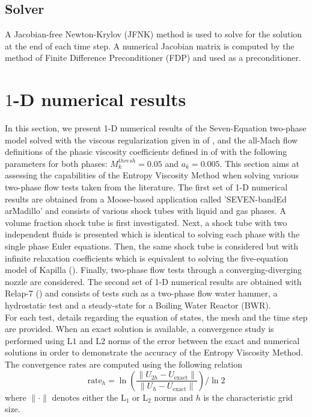 \documentclass[preprint,10pt]{elsarticle}
\begin{document}
\subsection{Solver} \label{sec:solver}
%
A Jacobian-free Newton-Krylov (JFNK) method is used to solve for the solution at the end of each time step. A numerical Jacobian matrix is computed by the 
method of Finite Difference Preconditioner (FDP) and used as a preconditioner.
%
\section{$1$-D numerical results}\label{sec:results}
%
In this section, we present 1-D numerical results of the Seven-Equation two-phase model solved with the viscous regularization given in  of , 
and the all-Mach flow definitions of the phasic viscosity coefficients defined in  of  with the following parameters for both phases: $M_k^{thresh}=0.05$ and $a_k=0.005$. This section aims at assessing the capabilities of the Entropy 
Viscosity Method when solving various two-phase flow tests taken from the literature. The first set of 1-D numerical results are obtained from a Moose-based 
application called 'SEVEN-bandEd arMadillo' and consists of various shock tubes with liquid and gas phases. A volume fraction shock tube is first 
investigated. Next, a shock tube with two independent fluids is presented which is identical to solving each phase with the single phase Euler equations. 
Then, the same shock tube is considered but with infinite relaxation coefficients which is equivalent to solving the five-equation model of Kapilla (\cite{Kapila_2001}). 
Finally, two-phase flow tests through a converging-diverging nozzle are considered. The second set of 1-D numerical results are obtained with Relap-7 (\cite{Berry_2014}) 
and consists of tests such as a two-phase flow water hammer, a hydrostatic test and a steady-state for a Boiling Water Reactor (BWR). \\
For each test, details regarding the equation of states, the mesh and the time step are provided. When an exact solution is available, a convergence study 
is performed using L$1$ and L$2$ norms of the error between the exact and numerical solutions in order to demonstrate the accuracy of the Entropy Viscosity Method. The convergence rates are computed using the following relation 
\begin{equation}
\label{eq:conv_rates}
\text{rate}_h = \ln \left( \frac{\| U_{2h}-U_{\text{exact}} \|}{\| U_{h}-U_{\text{exact}}\| } \right) / \ln 2
\end{equation}
where $\| \cdot \|$ denotes either the L$_1$ or L$_2$ norms and $h$ is the characteristic grid size.
\end{document}
